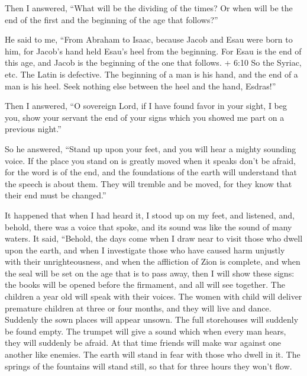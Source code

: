  Then I answered, ``What will be the dividing of the times?
Or when will be the end of the first and the beginning of the age that
follows?''

 He said to me, ``From Abraham to Isaac, because Jacob and
Esau were born to him, for Jacob's hand held Esau's heel from the
beginning.  For Esau is the end of this age, and Jacob is
the beginning of the one that follows.  + 6:10 So the
Syriac, etc. The Latin is defective. The beginning of a man is his hand,
and the end of a man is his heel. Seek nothing else between the heel and
the hand, Esdras!''

 Then I answered, ``O sovereign Lord, if I have found favor
in your sight,  I beg you, show your servant the end of
your signs which you showed me part on a previous night.''

 So he answered, ``Stand up upon your feet, and you will
hear a mighty sounding voice.  If the place you stand on is
greatly moved  when it speaks don't be afraid, for the word
is of the end, and the foundations of the earth will understand
 that the speech is about them. They will tremble and be
moved, for they know that their end must be changed.''

 It happened that when I had heard it, I stood up on my
feet, and listened, and, behold, there was a voice that spoke, and its
sound was like the sound of many waters.  It said,
``Behold, the days come when I draw near to visit those who dwell upon
the earth,  and when I investigate those who have caused
harm unjustly with their unrighteousness, and when the affliction of
Zion is complete,  and when the seal will be set on the age
that is to pass away, then I will show these signs: the books will be
opened before the firmament, and all will see together. 
The children a year old will speak with their voices. The women with
child will deliver premature children at three or four months, and they
will live and dance.  Suddenly the sown places will appear
unsown. The full storehouses will suddenly be found empty. 
The trumpet will give a sound which when every man hears, they will
suddenly be afraid.  At that time friends will make war
against one another like enemies. The earth will stand in fear with
those who dwell in it. The springs of the fountains will stand still, so
that for three hours they won't flow.

